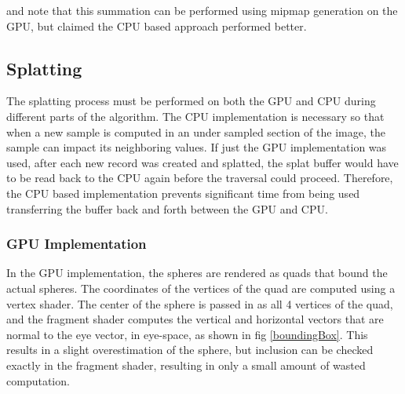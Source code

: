\documentclass[10pt,twopage]{acmsiggraph}
\begin{document}
\cite{mainarticle} and \cite{lc04} note that this summation can be performed using mipmap generation on the GPU, but \cite{mainarticle} claimed the CPU based approach performed better.

\subsection{Splatting}
The splatting process must be performed on both the GPU and CPU during different parts of the algorithm.  The CPU implementation is necessary so that when a new sample is computed in an under sampled section of the image, the sample can impact its neighboring values.  If just the GPU implementation was used, after each new record was created and splatted, the splat buffer would have to be read back to the CPU again before the traversal could proceed.  Therefore, the CPU based implementation prevents significant time from being used transferring the buffer back and forth between the GPU and CPU.

\subsubsection{GPU Implementation}
In the GPU implementation, the spheres are rendered as quads that bound the actual spheres.  The coordinates of the vertices of the quad are computed using a vertex shader.  The center of the sphere is passed in as all 4 vertices of the quad, and the fragment shader computes the vertical and horizontal vectors that are normal to the eye vector, in eye-space, as shown in fig \ref{boundingBox}.  This results in a slight overestimation of the sphere, but inclusion can be checked exactly in the fragment shader, resulting in only a small amount of wasted computation.  
\end{document}
